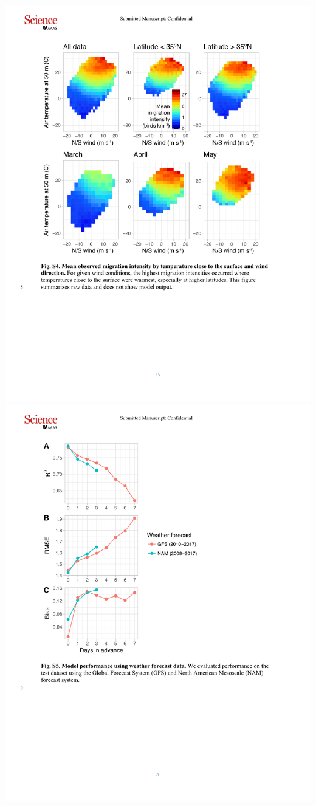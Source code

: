 \documentclass[a4paper, twoside]{templates/ociamthesis}
\begin{document}
\includegraphics[width=1\linewidth]{pdf_chapters/forecast/forecast_supp_crop_Part09}
\includegraphics[width=1\linewidth]{pdf_chapters/forecast/forecast_supp_crop_Part10}
\end{document}
